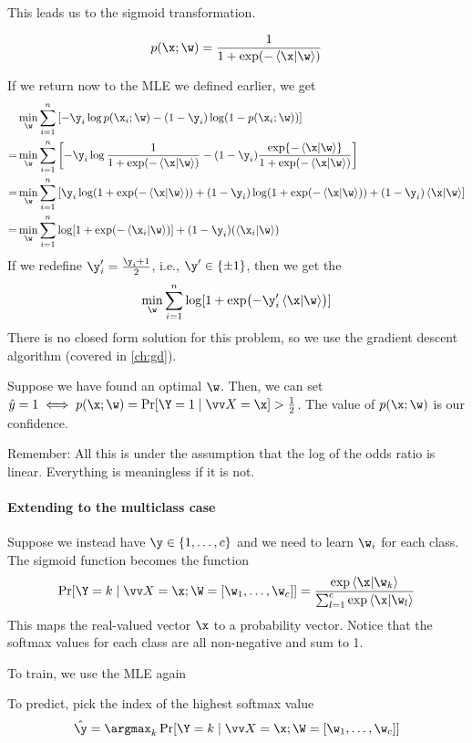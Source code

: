 \documentclass[class=cs480,notes,tikz]{agony}
\begin{document}
This leads us to the sigmoid transformation.
\begin{defn}
  \[p(\x;\w) = \frac{1}{1+\exp(-\ip{\x}{\w})}\]
\end{defn}

If we return now to the MLE we defined earlier, we get
\begin{align*}
    & \min_{\w}\sum_{i=1}^n\qty[-\y_i\log p(\x_i;\w)-(1-\y_i)\log(1-p(\x_i;\w))]                                                   \\
  = & \min_{\w}\sum_{i=1}^n\qty[-\y_i\log \frac{1}{1+\exp(-\ip{\x}{\w})} -(1-\y_i)\frac{\exp{-\ip{\x}{\w}}}{1+\exp(-\ip{\x}{\w})}] \\
  = & \min_{\w}\sum_{i=1}^n\qty[\y_i\log(1+\exp(-\ip{\x}{\w}))+(1-\y_i)\log(1+\exp(-\ip{\x}{\w})) + (1-\y_i)\ip{\x}{\w}]           \\
  = & \min_{\w}\sum_{i=1}^n \log[1+\exp(-\ip{\x_i}{\w})] + (1-\y_i)(\ip{\x_i}{\w})
\end{align*}
If we redefine $\y'_i = \frac{\y_i+1}{2}$, i.e., $\y' \in \{\pm1\}$,
then we get the 
\begin{equation}\label{eq:lgr}
  \min_{\w} \sum_{i=1}^n \log[1+\exp(-\y'_i\ip{\x}{\w})]
\end{equation}
There is no closed form solution for this problem,
so we use the gradient descent algorithm (covered in \cref{ch:gd}).

Suppose we have found an optimal $\w$.
Then, we can set $\hat y = 1 \iff p(\x;\w) = \Pr[\Y=1\mid\vv X=\x] > \frac12$.
The value of $p(\x;\w)$ is our confidence.

Remember: All this is under the assumption that the log of the odds ratio is linear.
Everything is meaningless if it is not.

\paragraph{Extending to the multiclass case}
Suppose we instead have $\y \in \{1,\dotsc,c\}$ and we need to learn $\w_i$ for each class.
The sigmoid function becomes the  function
\[
  \Pr[\Y = k \mid \vv X = \x; \W = [\w_1,\dotsc,\w_c]]
  = \frac{\exp\ip{\x}{\w_k}}{\sum_{l=1}^c\exp\ip{\x}{\w_l}}
\]
This maps the real-valued vector $\x$ to a probability vector.
Notice that the softmax values for each class are all non-negative and sum to 1.

To train, we use the MLE again

To predict, pick the index of the highest softmax value
\[ \hat{\y} = \argmax_k \Pr[\Y = k \mid \vv X = \x; \W = [\w_1,\dotsc,\w_c]] \]
\end{document}
